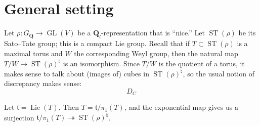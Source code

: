 \documentclass{article}
\DeclareMathOperator{\GL}{GL}
\DeclareMathOperator{\Lie}{Lie}
\DeclareMathOperator{\ST}{ST}
\newcommand{\bQ}{\mathbf{Q}}
\newcommand{\ft}{\mathfrak{t}}
\theoremstyle{definition}
\numberwithin{theorem}{section}
\begin{document}
\section{General setting}

Let $\rho\colon G_\bQ\to \GL(V)$ be a $\bQ_l$-representation that is ``nice.'' Let 
$\ST(\rho)$ be its Sato--Tate group; this is a compact Lie group. Recall that if 
$T\subset \ST(\rho)$ is a maximal torus and $W$ the corresponding Weyl group, 
then the natural map $T/W\to \ST(\rho)^\natural$ is an isomorphism. Since $T/W$ 
is the quotient of a torus, it makes sense to talk about (images of) cubes in 
$\ST(\rho)^\natural$, so the usual notion of discrepancy makes sense:
\[
	D_C
\]

Let $\ft=\Lie(T)$. Then $T=\ft/\pi_1(T)$, and the exponential map gives us a 
surjection $\ft/\pi_1(T) \twoheadrightarrow \ST(\rho)^\natural$. 





\printbibliography
\end{document}
